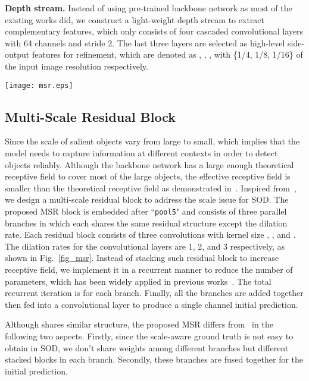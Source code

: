 \documentclass[runningheads]{llncs}
\begin{document}
\textbf{Depth stream.} Instead of using pre-trained backbone network as most of the existing works did, we construct a light-weight depth stream to extract complementary features, which only consists of four cascaded  convolutional layers with 64 channels and stride 2. The last three layers are selected as high-level side-output features for refinement, which are denoted as , , , with \{1/4, 1/8, 1/16\} of the input image resolution respectively.

\begin{figure*}  
  \centering  
  \texttt{[image: msr.eps]}
  \caption{The proposed multi-scale residual block. ``" denotes dilation rate.}  
  \label{fig_msr}  
\end{figure*}


\subsection{Multi-Scale Residual Block}
Since the scale of salient objects vary from large to small, which implies that the model needs to capture information at different contexts in order to detect objects reliably. Although the backbone network has a large enough theoretical receptive field to cover most of the large objects, the effective receptive field is smaller than the theoretical receptive field as demonstrated in~\cite{luo2016understanding}. Inspired from~\cite{li2019scale}, we design a multi-scale residual block to address the scale issue for SOD. The proposed MSR block is embedded after ``\texttt{pool5}" and consists of three parallel branches in which each shares the same residual structure except the dilation rate. Each residual block consists of three convolutions with kernel size , , and . The dilation rates for the  convolutional layers are 1, 2, and 3 respectively, as shown in Fig.~\ref{fig_msr}. Instead of stacking such residual block to increase receptive field, we implement it in a recurrent manner to reduce the number of parameters, which has been widely applied in previous works~\cite{zhang2018progressive}\cite{deng2018r3net}\cite{li2018recurrent}. The total recurrent iteration is  for each branch. Finally, all the branches are added together then fed into a  convolutional layer to produce a single channel initial prediction.

Although shares similar structure, the proposed MSR differs from~\cite{li2019scale} in the following two aspects. Firstly, since the scale-aware ground truth is not easy to obtain in SOD, we don't share weights among different branches but different stacked blocks in each branch. Secondly, these branches are fused together for the initial prediction. 
\end{document}

